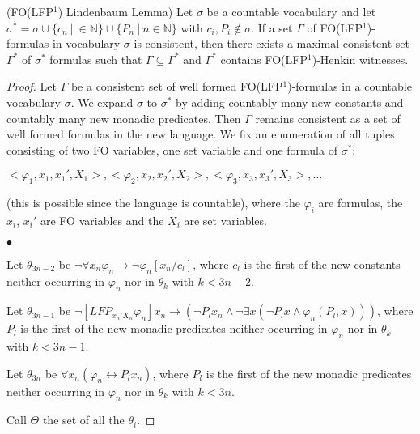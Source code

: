 \documentclass{LMCS}
\newcommand{\fo}{\textsf{FO}\xspace}
\newcommand{\folfp}{\textsf{FO(LFP$^1$)}\xspace}
\begin{document}
\begin{lem}(\folfp Lindenbaum Lemma)
Let $\sigma$ be a countable vocabulary and let $\sigma^*=\sigma \cup \{c_n ~|~ \in \mathbb{N}\} \cup \{P_n
~|~ n \in \mathbb{N}\}$ with $c_i, P_i \notin \sigma$. If a set $\Gamma$ of \folfp-formulas in vocabulary $\sigma$ is consistent, then there exists a maximal
consistent set $\Gamma^*$ of $\sigma^*$ formulas such that $\Gamma
\subseteq \Gamma^*$ and $\Gamma^*$ contains \folfp-Henkin
witnesses.
\label{folfplind}
\end{lem}

\begin{proof}
Let $\Gamma$ be a consistent set of well formed \folfp-formulas in
a countable vocabulary $\sigma$.
We expand $\sigma$ to $\sigma^*$ by adding countably many new constants and countably many new monadic predicates.
Then $\Gamma$ remains consistent as a set of well formed formulas
in the new language. We fix an enumeration of all tuples consisting of two \fo variables, one set variable and one formula
of $\sigma^*$:
\begin{center}
$<\varphi_1, x_1, x_1', X_1>,<\varphi_2, x_2, x_2', X_2>,<\varphi_3, x_3, x_3', X_3>,
\ldots$
\end{center}
(this is possible since the language is countable), where the $\varphi_i$
are formulas, the $x_i$, $x_i'$ are \fo variables and the $X_i$ are set variables.
\begin{iteMize}{$\bullet$}
\item   Let $\theta_{3n-2}$ be $\neg \forall x_n \varphi_n \rightarrow \neg \varphi_n[x_n/c_l]$,
where $c_l$ is the first of the new constants neither occurring in
$\varphi_n$ nor in $\theta_k$ with $k < 3n-2$.
\item   Let $\theta_{3n-1}$ be $\neg [LFP_{x_n'X_n}\varphi_n]x_n \rightarrow (\neg P_lx_n \wedge \neg
\exists x (\neg P_lx \wedge \varphi_n(P_l,x)))$, where $P_l$ is the
first of the new monadic predicates neither occurring in
$\varphi_n$ nor in $\theta_k$ with $k < 3n-1$.
\item   Let $\theta_{3n}$ be $\forall x_n (\varphi_n \leftrightarrow P_lx_n)$, where $P_l$ is the first of the new monadic predicates neither occurring in $\varphi_n$ nor in
$\theta_k$ with $k < 3n$.
\end{iteMize}

\noindent Call $\Theta$ the set of all the $\theta_i$.


\end{proof}
\end{document}
